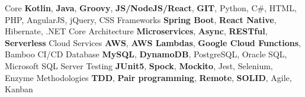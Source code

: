 %
%
%

	\begin{scholarship}
		\keywordsentry
			{Core}
			{\textbf{Kotlin}, \textbf{Java}, \textbf{Groovy}, \textbf{JS/NodeJS/React}, \textbf{GIT}, Python, C\#, HTML, PHP, AngularJS, jQuery, CSS}
		\keywordsentry
			{Frameworks}
			{\textbf{Spring Boot}, \textbf{React Native}, Hibernate, .NET Core}
		\keywordsentry
			{Architecture}
			{\textbf{Microservices}, \textbf{Async}, \textbf{RESTful}, \textbf{Serverless}}
		\keywordsentry
			{Cloud Services}
			{\textbf{AWS}, \textbf{AWS Lambdas}, \textbf{Google Cloud Functions}, Bamboo CI/CD}
		\keywordsentry
			{Database}
			{\textbf{MySQL}, \textbf{DynamoDB}, PostgreSQL, Oracle SQL, Microsoft SQL Server}
		\keywordsentry
			{Testing}
			{\textbf{JUnit5}, \textbf{Spock}, \textbf{Mockito}, Jest, Selenium, Enzyme}
		\keywordsentry
			{Methodologies}
			{\textbf{TDD}, \textbf{Pair programming}, \textbf{Remote}, \textbf{SOLID}, Agile, Kanban}
	\end{scholarship}